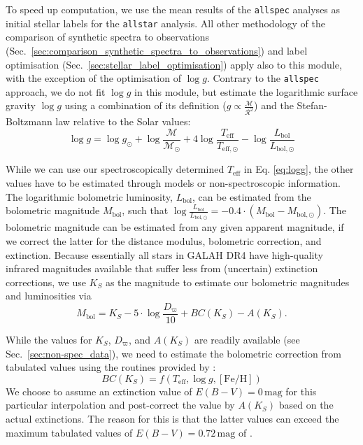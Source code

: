 \documentclass[
  journal=pasa,
  manuscript=research-paper, %
  year=2024,
  volume=37
]{cup-journal}
\newcommand{\logg}{$\log g$\xspace}
\begin{document}
To speed up computation, we use the mean results of the \texttt{allspec} analyses as initial stellar labels for the \texttt{allstar} analysis. All other methodology of the comparison of synthetic spectra to observations (Sec.~\ref{sec:comparison_synthetic_spectra_to_observations}) and label optimisation (Sec.~\ref{sec:stellar_label_optimisation}) apply also to this module, with the exception of the optimisation of \logg. Contrary to the \texttt{allspec} approach, we do not fit \logg in this module, but estimate the logarithmic surface gravity $\log g$ using a combination of its definition ($g \propto \frac{\mathcal{M}}{\mathcal{R}^2}$) and the Stefan-Boltzmann law relative to the Solar values:
\begin{equation}
\log g = \log g_\odot + \log \frac{\mathcal{M}}{\mathcal{M_\odot}} + 4 \log \frac{T_\mathrm{eff}}{T_\mathrm{eff,\odot}} - \log \frac{L_\mathrm{bol}}{L_\mathrm{bol,\odot}} \label{eq:logg}
\end{equation}

While we can use our spectroscopically determined $T_\mathrm{eff}$ in Eq. \ref{eq:logg}, the other values have to be estimated through models or non-spectroscopic information. The logarithmic bolometric luminosity, $L_\mathrm{bol}$, can be estimated from the bolometric magnitude $M_\mathrm{bol}$, such that $\log \frac{L_\mathrm{bol}}{L_\mathrm{bol,\odot}} = -0.4 \cdot \left(M_\mathrm{bol} - M_\mathrm{bol,\odot} \right)$. The bolometric magnitude can be estimated from any given apparent magnitude, if we correct the latter for the distance modulus, bolometric correction, and extinction. Because essentially all stars in GALAH DR4 have high-quality infrared magnitudes available that suffer less from (uncertain) extinction corrections, we use $K_S$ as the magnitude to estimate our bolometric magnitudes and luminosities via
\begin{equation}
M_\mathrm{bol} = K_S - 5\cdot \log \frac{D_\varpi}{10} + BC(K_S) - A(K_S). \label{eq:mbol}
\end{equation}

While the values for $K_S$, $D_\varpi$, and $A(K_S)$ are readily available (see Sec.~\ref{sec:non-spec_data}), we need to estimate the bolometric correction from tabulated values using the routines provided by \citet{Casagrande2018}:
\begin{equation}
BC(K_S) = f(T_\mathrm{eff}, \log g, \mathrm{[Fe/H]})
\label{eq:bc_ks}
\end{equation}
We choose to assume an extinction value of $E(B-V) = 0\,\mathrm{mag}$ for this particular interpolation and post-correct the value by $A(K_S)$ based on the actual extinctions. The reason for this is that the latter values can exceed the maximum tabulated values of $E(B-V) = 0.72\,\mathrm{mag}$ of \citet{Casagrande2018}.
\end{document}
